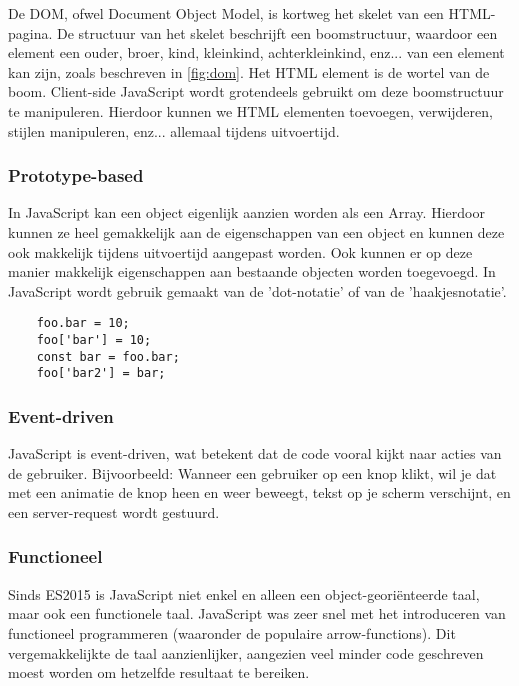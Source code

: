 De DOM, ofwel Document Object Model, is kortweg het skelet van een HTML-pagina. De structuur van het skelet beschrijft een boomstructuur, waardoor een element een ouder, broer, kind, kleinkind, achterkleinkind, enz... van een element kan zijn, zoals beschreven in \ref{fig:dom}. Het HTML element is de wortel van de boom. Client-side JavaScript wordt grotendeels gebruikt om deze boomstructuur te manipuleren. Hierdoor kunnen we HTML elementen toevoegen, verwijderen, stijlen manipuleren, enz... allemaal tijdens uitvoertijd. \textcite{Kantor2017}

\subsubsection{Prototype-based}
\label{sec:prototypeBased}

In JavaScript kan een object eigenlijk aanzien worden als een Array. Hierdoor kunnen ze heel gemakkelijk aan de eigenschappen van een object en kunnen deze ook makkelijk tijdens uitvoertijd aangepast worden. Ook kunnen er op deze manier makkelijk eigenschappen aan bestaande objecten worden toegevoegd. In JavaScript wordt gebruik gemaakt van de 'dot-notatie' of van de 'haakjesnotatie'. 

	\begin{verbatim}
	foo.bar = 10;
	foo['bar'] = 10;
	const bar = foo.bar;
	foo['bar2'] = bar;
	\end{verbatim}

\subsubsection{Event-driven}
\label{sec:eventDriven}

JavaScript is event-driven, wat betekent dat de code vooral kijkt naar acties van de gebruiker. Bijvoorbeeld: Wanneer een gebruiker op een knop klikt, wil je dat met een animatie de knop heen en weer beweegt, tekst op je scherm verschijnt, en een server-request wordt gestuurd. 

\subsubsection{Functioneel}
\label{sec:functional}

Sinds ES2015 is JavaScript niet enkel en alleen een object-georiënteerde taal, maar ook een functionele taal. JavaScript was zeer snel met het introduceren van functioneel programmeren (waaronder de populaire arrow-functions). Dit vergemakkelijkte de taal aanzienlijker, aangezien veel minder code geschreven moest worden om hetzelfde resultaat te bereiken.

